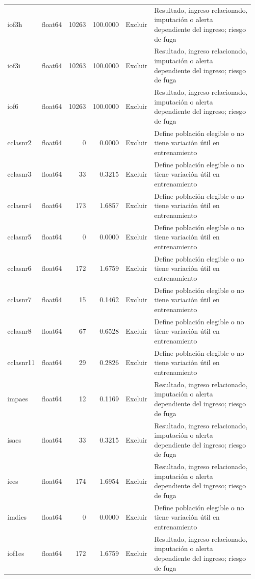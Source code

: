 \begin{longtable}{llrrll}
iof3h & float64 & 10263 & 100.0000 & Excluir & Resultado, ingreso relacionado, imputación o alerta dependiente del ingreso; riesgo de fuga \\
iof3i & float64 & 10263 & 100.0000 & Excluir & Resultado, ingreso relacionado, imputación o alerta dependiente del ingreso; riesgo de fuga \\
iof6 & float64 & 10263 & 100.0000 & Excluir & Resultado, ingreso relacionado, imputación o alerta dependiente del ingreso; riesgo de fuga \\
cclasnr2 & float64 & 0 & 0.0000 & Excluir & Define población elegible o no tiene variación útil en entrenamiento \\
cclasnr3 & float64 & 33 & 0.3215 & Excluir & Define población elegible o no tiene variación útil en entrenamiento \\
cclasnr4 & float64 & 173 & 1.6857 & Excluir & Define población elegible o no tiene variación útil en entrenamiento \\
cclasnr5 & float64 & 0 & 0.0000 & Excluir & Define población elegible o no tiene variación útil en entrenamiento \\
cclasnr6 & float64 & 172 & 1.6759 & Excluir & Define población elegible o no tiene variación útil en entrenamiento \\
cclasnr7 & float64 & 15 & 0.1462 & Excluir & Define población elegible o no tiene variación útil en entrenamiento \\
cclasnr8 & float64 & 67 & 0.6528 & Excluir & Define población elegible o no tiene variación útil en entrenamiento \\
cclasnr11 & float64 & 29 & 0.2826 & Excluir & Define población elegible o no tiene variación útil en entrenamiento \\
impaes & float64 & 12 & 0.1169 & Excluir & Resultado, ingreso relacionado, imputación o alerta dependiente del ingreso; riesgo de fuga \\
isaes & float64 & 33 & 0.3215 & Excluir & Resultado, ingreso relacionado, imputación o alerta dependiente del ingreso; riesgo de fuga \\
iees & float64 & 174 & 1.6954 & Excluir & Resultado, ingreso relacionado, imputación o alerta dependiente del ingreso; riesgo de fuga \\
imdies & float64 & 0 & 0.0000 & Excluir & Define población elegible o no tiene variación útil en entrenamiento \\
iof1es & float64 & 172 & 1.6759 & Excluir & Resultado, ingreso relacionado, imputación o alerta dependiente del ingreso; riesgo de fuga \\

\end{longtable}
